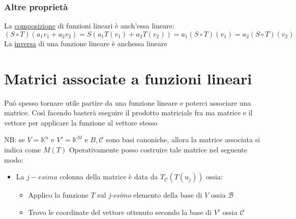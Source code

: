 \documentclass[12pt,a4paper,oneside]{article}
\begin{document}
\subsubsection*{Altre proprietà}
La \underline{composizione} di funzioni lineari è anch'essa lineare:
\[
	(S \circ T)\left(a_1 v_1+a_2 v_2\right)=S\left(a_1 T\left(v_1\right)+a_2 T\left(v_2\right)\right) = a_1 \left( S \circ T \right)  \left( v_1 \right) = a_2 \left( S \circ T \right)  \left( v_2 \right)
\]
La \underline{inversa} di una funzione lineare è anchessa lineare
\section{Matrici associate a funzioni lineari}
Può spesso tornare utile partire da una funzione lineare e poterci associare una matrice. Così facendo basterà eseguire il prodotto matriciale fra ma matrice e il vettore per applicare la funzione al vettore stesso

\label{Matrice associata}
NB: se $ V = \mathbb{K}^{n} $ e $ V' = \mathbb{K}^{M} $ e $ B,\mathcal{C} $ sono basi canoniche, allora la matrice associata si indica come $ M\left( T \right)  $
\vskip3mm
Operativamente posso costruire tale matrice nel seguente modo:
\begin{itemize}
	\item La $ j-esima $ colonna della matrice è data da $ T_\mathcal{C}\left( T\left( u_j \right)  \right)  $ ossia:
	      \begin{itemize}
		      \item Applico la funzione $ T $ sul \textit{j-esimo} elemento della base di $ V $ ossia $ \mathcal{B} $
		      \item Trovo le coordinate del vettore ottenuto secondo la base di $ V' $ ossia $ \mathcal{C} $
	      \end{itemize}
\end{itemize}
\end{document}
